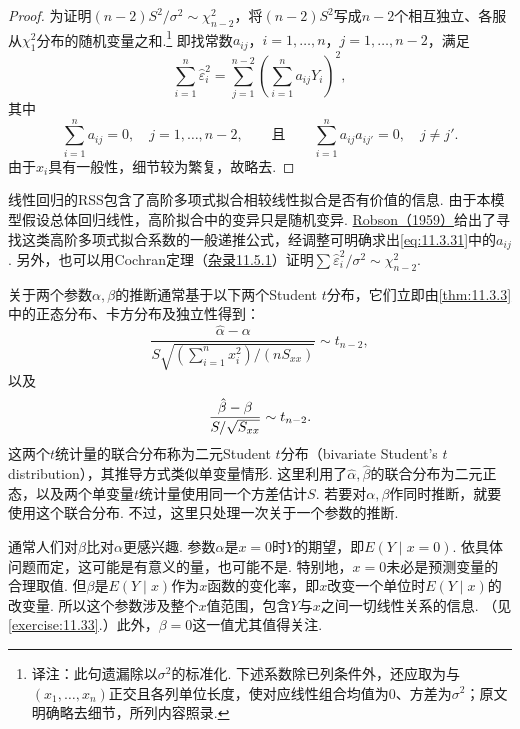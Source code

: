 \begin{proof}
为证明$(n-2)S^2/\sigma^2\sim\chi^2_{n-2}$，将$(n-2)S^2$写成$n-2$个相互独立、各服从$\chi^2_1$分布的随机变量之和.\footnote{译注：此句遗漏除以$\sigma^2$的标准化. 下述系数除已列条件外，还应取为与$(x_1,\ldots,x_n)$正交且各列单位长度，使对应线性组合均值为0、方差为$\sigma^2$；原文明确略去细节，所列内容照录.} 即找常数$a_{ij}$，$i=1,\ldots,n$，$j=1,\ldots,n-2$，满足
\begin{equation}\label{eq:11.3.31}
\sum_{i=1}^n\hat\varepsilon_i^2
=\sum_{j=1}^{n-2}\left(\sum_{i=1}^na_{ij}Y_i\right)^2,
\end{equation}
其中
$$\sum_{i=1}^na_{ij}=0,\quad j=1,\ldots,n-2,
\qquad\text{且}\qquad\sum_{i=1}^na_{ij}a_{ij'}=0,\quad j\ne j'.$$
由于$x_i$具有一般性，细节较为繁复，故略去.
\end{proof}

线性回归的RSS包含了高阶多项式拟合相较线性拟合是否有价值的信息. 由于本模型假设总体回归线性，高阶拟合中的变异只是随机变异. \hyperref[bib:source257]{Robson（1959）}给出了寻找这类高阶多项式拟合系数的一般递推公式，经调整可明确求出\eqref{eq:11.3.31}中的$a_{ij}$. 另外，也可以用Cochran定理（\hyperref[sec:11.5.1]{杂录11.5.1}）证明$\sum\hat\varepsilon_i^2/\sigma^2\sim\chi^2_{n-2}$.

关于两个参数$\alpha,\beta$的推断通常基于以下两个Student $t$分布，它们立即由\autoref{thm:11.3.3}中的正态分布、卡方分布及独立性得到：
\begin{equation}\label{eq:11.3.32}
\frac{\hat\alpha-\alpha}{S\sqrt{(\sum_{i=1}^nx_i^2)/(nS_{xx})}}\sim t_{n-2},
\end{equation}
以及
\begin{equation}\label{eq:11.3.33}\index{SI0908@t统计量}
\frac{\hat\beta-\beta}{S/\sqrt{S_{xx}}}\sim t_{n-2}.
\end{equation}
这两个$t$统计量的联合分布称为二元Student $t$分布（bivariate Student's $t$ distribution），其推导方式类似单变量情形. 这里利用了$\hat\alpha,\hat\beta$的联合分布为二元正态，以及两个单变量$t$统计量使用同一个方差估计$S$. 若要对$\alpha,\beta$作同时推断，就要使用这个联合分布. 不过，这里只处理一次关于一个参数的推断.

通常人们对$\beta$比对$\alpha$更感兴趣. 参数$\alpha$是$x=0$时$Y$的期望，即$E(Y\mid x=0)$. 依具体问题而定，这可能是有意义的量，也可能不是. 特别地，$x=0$未必是预测变量的合理取值. 但$\beta$是$E(Y\mid x)$作为$x$函数的变化率，即$x$改变一个单位时$E(Y\mid x)$的改变量. 所以这个参数涉及整个$x$值范围，包含$Y$与$x$之间一切线性关系的信息. （见\autoref{exercise:11.33}.）此外，$\beta=0$这一值尤其值得关注.

